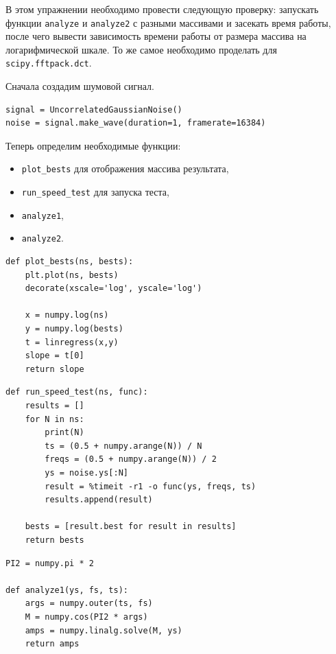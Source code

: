 \documentclass[a4paper, 14pt]{extarticle}
\begin{document}
    В этом упражнении необходимо провести следующую проверку: запускать функции \texttt{analyze} и \texttt{analyze2} с разными массивами и
    засекать время работы, после чего вывести зависимость времени работы от размера массива на логарифмической шкале.
    То же самое необходимо проделать для \texttt{scipy.fftpack.dct}.

    Сначала создадим шумовой сигнал.

    \begin{lstlisting}[caption= Создание шумового сигнала., label={lst:task1_signal}]
signal = UncorrelatedGaussianNoise()
noise = signal.make_wave(duration=1, framerate=16384)   \end{lstlisting}

    Теперь определим необходимые функции:
    \begin{itemize}
        \item \texttt{plot\_bests} для отображения массива результата,
        \item \texttt{run\_speed\_test} для запуска теста,
        \item \texttt{analyze1},
        \item \texttt{analyze2}.
    \end{itemize}

    \begin{lstlisting}[caption= Функция \texttt{plot\_bests}., label={lst:task1_plot_bests}]
def plot_bests(ns, bests):
    plt.plot(ns, bests)
    decorate(xscale='log', yscale='log')

    x = numpy.log(ns)
    y = numpy.log(bests)
    t = linregress(x,y)
    slope = t[0]
    return slope    \end{lstlisting}

    \begin{lstlisting}[caption= Функция \texttt{run\_speed\_test}., label={lst:task1_run_speed_test}]
def run_speed_test(ns, func):
    results = []
    for N in ns:
        print(N)
        ts = (0.5 + numpy.arange(N)) / N
        freqs = (0.5 + numpy.arange(N)) / 2
        ys = noise.ys[:N]
        result = %timeit -r1 -o func(ys, freqs, ts)
        results.append(result)

    bests = [result.best for result in results]
    return bests    \end{lstlisting}

    \begin{lstlisting}[caption= Функция \texttt{analyze1}., label={lst:task1_analyze1}]
PI2 = numpy.pi * 2

def analyze1(ys, fs, ts):
    args = numpy.outer(ts, fs)
    M = numpy.cos(PI2 * args)
    amps = numpy.linalg.solve(M, ys)
    return amps     \end{lstlisting}
\end{document}
